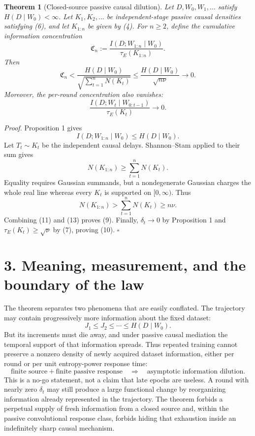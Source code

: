 \documentclass[10pt]{article}
\theoremstyle{compact}
\newtheorem{theorem}{Theorem}
\newcommand{\EP}{N}
\newcommand{\C}{\mathfrak C}
\begin{document}
\begin{theorem}[Closed-source passive causal dilution]
Let $D,W_0,W_1,\ldots$ satisfy $H(D\mid W_0)<\infty$. Let $K_1,K_2,\ldots$ be independent-stage passive causal densities satisfying (6), and let $K_{1:n}$ be given by (4). For $n\ge2$, define the cumulative information concentration
\[
\C_n:=\frac{I(D;W_{1:n}\mid W_0)}{\tau_{\!E}(K_{1:n})}.
\tag{8}
\]
Then
\[
\boxed{
\C_n
<
\frac{H(D\mid W_0)}
{\sqrt{\sum_{t=1}^{n}\EP(K_t)}}
\le
\frac{H(D\mid W_0)}{\sqrt{n\nu}}
\longrightarrow0.}
\tag{9}
\]
Moreover, the per-round concentration also vanishes:
\[
\boxed{
\frac{I(D;W_t\mid W_{0:t-1})}{\tau_{\!E}(K_t)}
\longrightarrow0.}
\tag{10}
\]
\end{theorem}

\emph{Proof.}
Proposition 1 gives
\[
I(D;W_{1:n}\mid W_0)\le H(D\mid W_0).
\tag{11}
\]
Let $T_t\sim K_t$ be the independent causal delays. Shannon--Stam applied to their sum gives
\[
\EP(K_{1:n})\ge\sum_{t=1}^{n}\EP(K_t).
\tag{12}
\]
Equality requires Gaussian summands, but a nondegenerate Gaussian charges the whole real line whereas every $K_t$ is supported on $[0,\infty)$. Thus
\[
\EP(K_{1:n})>\sum_{t=1}^{n}\EP(K_t)\ge n\nu.
\tag{13}
\]
Combining (11) and (13) proves (9). Finally, $\delta_t\to0$ by Proposition 1 and $\tau_E(K_t)\ge\sqrt\nu$ by (7), proving (10). \hfill$\square$

\newpage
\section*{3. Meaning, measurement, and the boundary of the law}
The theorem separates two phenomena that are easily conflated. The trajectory may contain progressively more information about the fixed dataset:
\[
J_1\le J_2\le\cdots\le H(D\mid W_0).
\]
But its increments must die away, and under passive causal mediation the temporal support of that information spreads. Thus repeated training cannot preserve a nonzero density of newly acquired dataset information, either per round or per unit entropy-power response time:
\[
\boxed{
\text{finite source} + \text{finite passive response}
\quad\Longrightarrow\quad
\text{asymptotic information dilution}.}
\]
This is a no-go statement, not a claim that late epochs are useless. A round with nearly zero $\delta_t$ may still produce a large functional change by reorganizing information already represented in the trajectory. The theorem forbids a perpetual supply of fresh information from a closed source and, within the passive convolutional response class, forbids hiding that exhaustion inside an indefinitely sharp causal mechanism.
\end{document}
